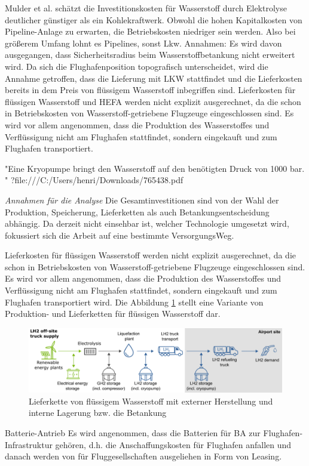 Mulder et al. \cite{mulder2019outlook} schätzt die Investitionskosten für Wasserstoff durch Elektrolyse deutlicher günstiger als ein Kohlekraftwerk. 
Obwohl die hohen Kapitalkosten von Pipeline-Anlage zu erwarten, die Betriebskosten niedriger sein werden. Also bei größerem Umfang lohnt es Pipelines, sonst Lkw.
Annahmen:
Es wird davon ausgegangen, dass Sicherheitsradius beim Wasserstoffbetankung nicht erweitert wird.
Da sich die Flughafenposition topografisch unterscheidet, wird die Annahme getroffen, dass die Lieferung mit LKW stattfindet 
und die Lieferkosten bereits in dem Preis von flüssigem Wasserstoff inbegriffen sind.
Lieferkosten für flüssigen Wasserstoff  und HEFA werden nicht explizit ausgerechnet,
da die schon in Betriebskosten von Wasserstoff-getriebene Flugzeuge eingeschlossen sind. Es wird vor allem angenommen, dass die Produktion 
des Wasserstoffes und Verflüssigung nicht am Flughafen stattfindet, sondern eingekauft und zum Flughafen transportiert.


"Eine Kryopumpe 
bringt den Wasserstoff auf den benötigten Druck von 1000 bar. " ?file:///C:/Users/henri/Downloads/765438.pdf

\textit{Annahmen für die Analyse}
Die Gesamtinvestitionen sind von der Wahl der Produktion, Speicherung, Lieferketten als auch Betankungsentscheidung abhängig.
Da derzeit nicht einsehbar ist, welcher Technologie umgesetzt wird, fokussiert sich die Arbeit auf eine bestimmte VersorgungsWeg.

Lieferkosten für flüssigen Wasserstoff  werden nicht explizit ausgerechnet,
da die schon in Betriebskosten von Wasserstoff-getriebene Flugzeuge eingeschlossen sind. Es wird vor allem angenommen, dass die Produktion 
des Wasserstoffes und Verflüssigung nicht am Flughafen stattfindet, sondern eingekauft und zum Flughafen transportiert wird.
Die Abbildung \ref{supply_wasserstoff} stellt eine Variante von Produktion- und Lieferketten für flüssigen Wasserstoff dar.

\begin{figure}[h]
	\centering
	\includegraphics[width=0.9\linewidth]{Bilder/Supply_hydrogen.png}
	\caption[Lieferkette von flüssigem Wasserstoff mit externer Herstellung und interner Lagerung bzw. die Betankung]{Lieferkette von flüssigem Wasserstoff mit externer Herstellung und interne Lagerung bzw. die Betankung \cite{schenke2024lh2}}
	\label{supply_wasserstoff}
\end{figure}

Batterie-Antrieb
Es wird angenommen, dass die Batterien für BA zur Flughafen-Infrastruktur gehören, 
d.h. die Anschaffungskosten für Flughafen anfallen und danach werden von für Fluggesellschaften ausgeliehen in Form von Leasing.
